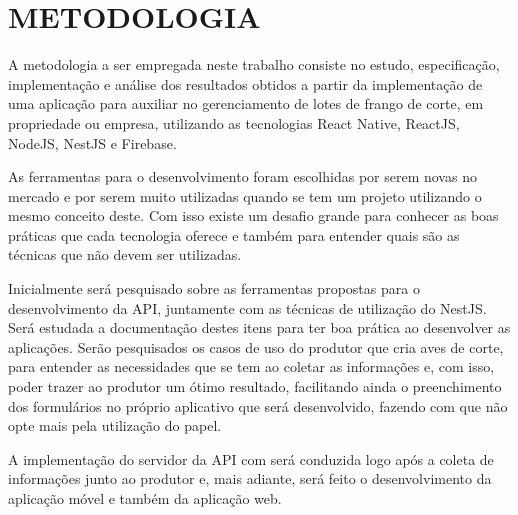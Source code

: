 
\chapter{METODOLOGIA}
\label{chap:metodologia}

A metodologia a ser empregada neste trabalho consiste no estudo, especificação, implementação e análise dos resultados obtidos a partir da implementação de uma aplicação para auxiliar no gerenciamento de lotes  de frango de corte, em propriedade ou empresa, utilizando as tecnologias React Native, ReactJS, NodeJS, NestJS e Firebase.

As ferramentas para o desenvolvimento foram escolhidas por serem novas no mercado e por serem muito utilizadas quando se tem um projeto utilizando o mesmo conceito deste. Com isso existe um desafio grande para conhecer as boas práticas que cada tecnologia oferece e também para entender quais são as técnicas que não devem ser utilizadas.

Inicialmente será pesquisado sobre as ferramentas propostas para o desenvolvimento da API, juntamente com as técnicas de utilização do NestJS. Será estudada a documentação destes itens para ter boa prática ao desenvolver as aplicações. Serão pesquisados os casos de uso do produtor que cria aves de corte, para entender as necessidades que se tem ao coletar as informações e, com isso, poder trazer ao produtor um ótimo resultado, facilitando ainda o preenchimento dos formulários no próprio aplicativo que será desenvolvido, fazendo com que não opte mais pela utilização do papel. 

A implementação do servidor da API com será conduzida logo após a coleta de informações junto ao produtor e, mais adiante, será feito o desenvolvimento da aplicação móvel e também da aplicação web.

